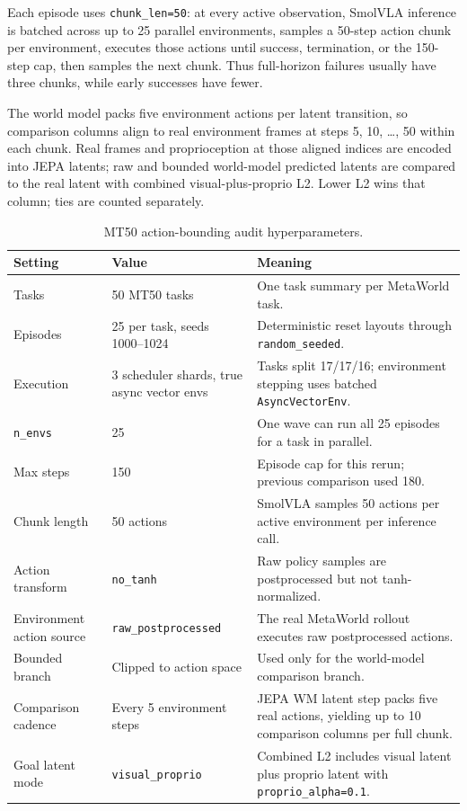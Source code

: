 Each episode uses \texttt{chunk\_len=50}: at every active observation, SmolVLA inference is batched across up to 25 parallel environments, samples a 50-step action chunk per environment, executes those actions until success, termination, or the 150-step cap, then samples the next chunk. Thus full-horizon failures usually have three chunks, while early successes have fewer.

The world model packs five environment actions per latent transition, so comparison columns align to real environment frames at steps 5, 10, \ldots, 50 within each chunk. Real frames and proprioception at those aligned indices are encoded into JEPA latents; raw and bounded world-model predicted latents are compared to the real latent with combined visual-plus-proprio L2. Lower L2 wins that column; ties are counted separately.


\begin{table}[H]
\centering
\caption{MT50 action-bounding audit hyperparameters.}
\label{tab:action-audit-hyperparameters}
\begin{tabularx}{\linewidth}{@{}l l X@{}}
\toprule
Setting & Value & Meaning \\
\midrule
Tasks & 50 MT50 tasks & One task summary per MetaWorld task. \\
Episodes & 25 per task, seeds 1000--1024 & Deterministic reset layouts through \texttt{random\_seeded}. \\
Execution & 3 scheduler shards, true async vector envs & Tasks split 17/17/16; environment stepping uses batched \texttt{AsyncVectorEnv}. \\
\texttt{n\_envs} & 25 & One wave can run all 25 episodes for a task in parallel. \\
Max steps & 150 & Episode cap for this rerun; previous comparison used 180. \\
Chunk length & 50 actions & SmolVLA samples 50 actions per active environment per inference call. \\
Action transform & \texttt{no\_tanh} & Raw policy samples are postprocessed but not tanh-normalized. \\
Environment action source & \texttt{raw\_postprocessed} & The real MetaWorld rollout executes raw postprocessed actions. \\
Bounded branch & Clipped to action space & Used only for the world-model comparison branch. \\
Comparison cadence & Every 5 environment steps & JEPA WM latent step packs five real actions, yielding up to 10 comparison columns per full chunk. \\
Goal latent mode & \texttt{visual\_proprio} & Combined L2 includes visual latent plus proprio latent with \texttt{proprio\_alpha=0.1}. \\
\bottomrule
\end{tabularx}
\end{table}


